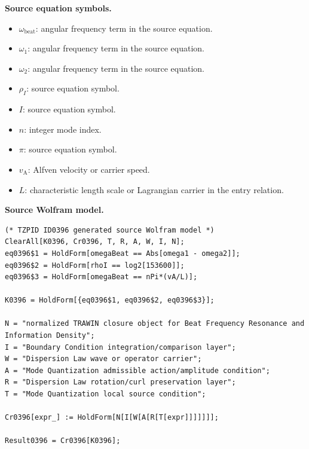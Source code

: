 \begin{minipage}[t]{0.49\linewidth}
\begingroup
\small
\raggedright
\textbf{Source equation symbols.}\par
\begin{itemize}[leftmargin=1.35em,itemsep=1pt,topsep=1pt,parsep=0pt]
    \item $\omega_{\mathrm{beat}}$: angular frequency term in the source equation.
    \item $\omega_{1}$: angular frequency term in the source equation.
    \item $\omega_{2}$: angular frequency term in the source equation.
    \item $\rho_{I}$: source equation symbol.
    \item $I$: source equation symbol.
    \item $n$: integer mode index.
    \item $\pi$: source equation symbol.
    \item $v_{\mathrm{A}}$: Alfven velocity or carrier speed.
    \item $L$: characteristic length scale or Lagrangian carrier in the entry relation.
\end{itemize}
\endgroup
\end{minipage}\hfill
\begin{minipage}[t]{0.47\linewidth}
\begingroup
\scriptsize
\raggedright
\textbf{Source Wolfram model.}\par
\begin{Verbatim}[fontsize=\tiny,breaklines=true,breakanywhere=true]
(* TZPID ID0396 generated source Wolfram model *)
ClearAll[K0396, Cr0396, T, R, A, W, I, N];
eq0396$1 = HoldForm[omegaBeat == Abs[omega1 - omega2]];
eq0396$2 = HoldForm[rhoI == log2[153600]];
eq0396$3 = HoldForm[omegaBeat == nPi*(vA/L)];

K0396 = HoldForm[{eq0396$1, eq0396$2, eq0396$3}];

N = "normalized TRAWIN closure object for Beat Frequency Resonance and Information Density";
I = "Boundary Condition integration/comparison layer";
W = "Dispersion Law wave or operator carrier";
A = "Mode Quantization admissible action/amplitude condition";
R = "Dispersion Law rotation/curl preservation layer";
T = "Mode Quantization local source condition";

Cr0396[expr_] := HoldForm[N[I[W[A[R[T[expr]]]]]]];

Result0396 = Cr0396[K0396];
\end{Verbatim}
\endgroup
\end{minipage}

